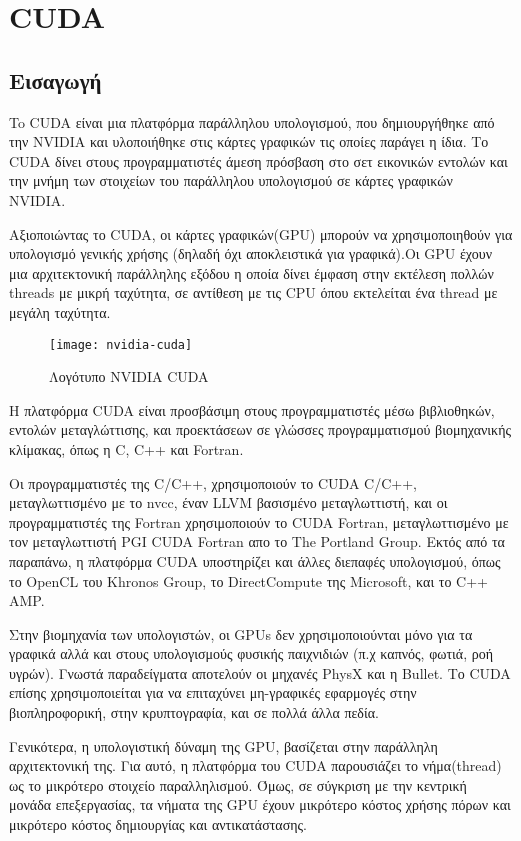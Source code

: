\section{CUDA}
\subsection{Εισαγωγή}
To CUDA είναι μια πλατφόρμα παράλληλου υπολογισμού, που δημιουργήθηκε από την NVIDIA και υλοποιήθηκε στις κάρτες γραφικών τις οποίες παράγει η ίδια. Το CUDA δίνει στους προγραμματιστές άμεση πρόσβαση στο σετ εικονικών εντολών και την μνήμη των στοιχείων του παράλληλου υπολογισμού σε κάρτες γραφικών NVIDIA. 

Αξιοποιώντας το CUDA, οι κάρτες γραφικών(GPU) μπορούν να χρησιμοποιηθούν για υπολογισμό γενικής χρήσης (δηλαδή όχι αποκλειστικά για γραφικά).Οι GPU έχουν μια αρχιτεκτονική παράλληλης εξόδου η οποία δίνει έμφαση στην εκτέλεση πολλών threads με μικρή ταχύτητα, σε αντίθεση με τις CPU όπου εκτελείται ένα thread με μεγάλη ταχύτητα. 

\begin{figure}[h]
\centering
\texttt{[image: nvidia-cuda]}
\caption{Λογότυπο NVIDIA CUDA}
\end{figure}

Η πλατφόρμα CUDA είναι προσβάσιμη στους προγραμματιστές μέσω βιβλιοθηκών, εντολών μεταγλώττισης, και προεκτάσεων σε γλώσσες προγραμματισμού βιομηχανικής κλίμακας, όπως η C, C++ και Fortran.

Οι προγραμματιστές της C/C++, χρησιμοποιούν το CUDA C/C++, μεταγλωττισμένο με το nvcc, έναν LLVM βασισμένο μεταγλωττιστή, και οι προγραμματιστές της Fortran χρησιμοποιούν το CUDA Fortran, μεταγλωττισμένο με τον μεταγλωττιστή PGI CUDA Fortran απο το The Portland Group. Εκτός από τα παραπάνω, η πλατφόρμα CUDA υποστηρίζει και άλλες διεπαφές υπολογισμού, όπως το OpenCL του Khronos Group, το DirectCompute της Microsoft, και το C++ AMP.

Στην βιομηχανία των υπολογιστών, οι GPUs δεν χρησιμοποιούνται μόνο για τα γραφικά αλλά και στους υπολογισμούς φυσικής παιχνιδιών (π.χ καπνός, φωτιά, ροή υγρών). Γνωστά παραδείγματα αποτελούν οι μηχανές PhysX και η Bullet. Το CUDA επίσης χρησιμοποιείται για να επιταχύνει μη-γραφικές εφαρμογές στην βιοπληροφορική, στην κρυπτογραφία, και σε πολλά άλλα πεδία.\cite{cuda-1}

Γενικότερα, η υπολογιστική δύναμη της GPU, βασίζεται στην παράλληλη αρχιτεκτονική της. Για αυτό, η πλατφόρμα του CUDA παρουσιάζει το νήμα(thread) ως το μικρότερο στοιχείο παραλληλισμού. Όμως, σε σύγκριση με την κεντρική μονάδα επεξεργασίας, τα νήματα της GPU έχουν μικρότερο κόστος χρήσης πόρων και μικρότερο κόστος δημιουργίας και αντικατάστασης.

